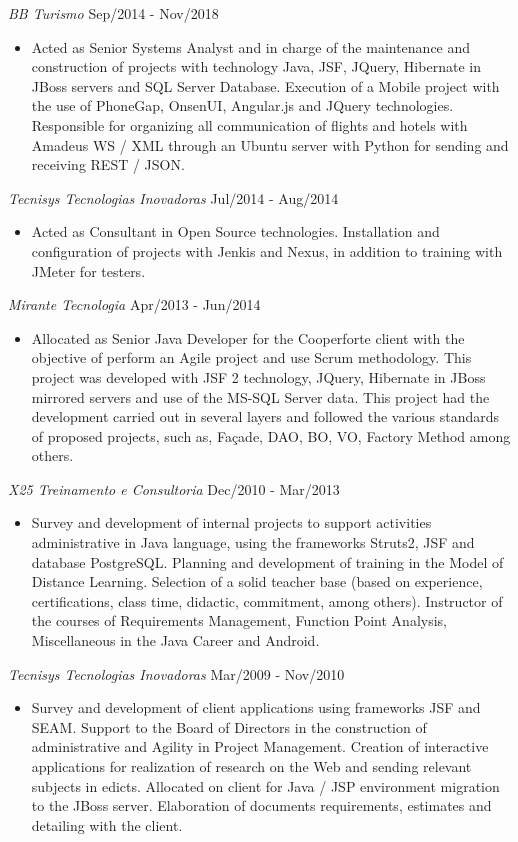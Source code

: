 \documentclass{res}
\begin{document}
\begin{resume}
		{\sl BB Turismo} \hfill Sep/2014 - Nov/2018
		\begin{itemize}
			\item Acted as Senior Systems Analyst and in charge of the maintenance and construction of projects with technology Java, JSF, JQuery, Hibernate in JBoss servers and SQL Server Database. Execution of a Mobile project with the use of PhoneGap, OnsenUI, Angular.js and JQuery technologies. Responsible for organizing all communication of flights and hotels with Amadeus WS / XML through an Ubuntu server with Python for sending and receiving REST / JSON.
		\end{itemize}
		
		{\sl Tecnisys Tecnologias Inovadoras} \hfill Jul/2014 - Aug/2014
		\begin{itemize}
			\item Acted as Consultant in Open Source technologies. Installation and configuration of projects with Jenkis and Nexus, in addition to training with JMeter for testers.
		\end{itemize}
		
		{\sl Mirante Tecnologia} \hfill Apr/2013 - Jun/2014
		\begin{itemize}
			\item Allocated as Senior Java Developer for the Cooperforte client with the objective of perform an Agile project and use Scrum methodology. This project was developed with JSF 2 technology, JQuery, Hibernate in JBoss mirrored servers and use of the MS-SQL Server data. This project had the development carried out in several layers and followed the various standards of proposed projects, such as, Façade, DAO, BO, VO, Factory Method among others.
		\end{itemize}
		
		{\sl X25 Treinamento e Consultoria} \hfill Dec/2010 - Mar/2013
		\begin{itemize}
			\item Survey and development of internal projects to support activities administrative in Java language, using the frameworks Struts2, JSF and database PostgreSQL. Planning and development of training in the Model of Distance Learning. Selection of a solid teacher base (based on experience, certifications, class time, didactic, commitment, among others). Instructor of the courses of Requirements Management, Function Point Analysis, Miscellaneous in the Java Career
			and Android.
		\end{itemize}
		
		{\sl Tecnisys Tecnologias Inovadoras} \hfill Mar/2009 - Nov/2010
		\begin{itemize}
			\item Survey and development of client applications using frameworks JSF and SEAM. Support to the Board of Directors in the construction of administrative and Agility in Project Management. Creation of interactive applications for realization of research on the Web and sending relevant subjects in edicts. Allocated on client for Java / JSP environment migration to the JBoss server. Elaboration of documents requirements, estimates and detailing with the client.
		\end{itemize}
	

\end{resume}
\end{document}
